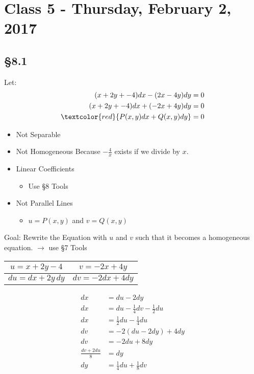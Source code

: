 \chapter{Class 5 - Thursday, February 2, 2017}
\section*{\S 8.1}
\begin{ex} Let:
\begin{align*}
    (x+2y+-4)dx-(2x-4y)dy&=0\\
    (x+2y+-4)dx+(-2x+4y)dy&=0\\
    \textcolor{red}{P(x,y)dx+Q(x,y)dy}&=0
\end{align*}
\begin{itemize}
  \item Not Separable
  \item Not Homogeneous Because $-\frac{4}{x}$ exists if we divide by $x$.
  \item Linear Coefficients
  \begin{itemize}
    \item Use \S 8 Tools
  \end{itemize}
  \item Not Parallel Lines
  \begin{itemize}
  \item  $u=P(x,y)$ and $v=Q(x,y)$
  \end{itemize}
\end{itemize}
\begin{note}
Goal: Rewrite the Equation with $u$ and $v$ such that it becomes a homogeneous equation. $\rightarrow$ use \S 7 Tools
\end{note}
\begin{center}
 \begin{tabular}{|c|c|} 
 \hline
 $u=x+2y-4$ & $v=-2x+4y$\\
 \hline
 $du=dx+2y\,dy$ & $dv=-2dx+4dy$\\ 
 \hline
\end{tabular}
\end{center}
\begin{align*}
    dx&= du-2dy\\
    dx&=du-\frac{1}{4}dv-\frac{1}{2}du\\
    dx&=\frac{1}{2}du-\frac{1}{4}du\\
    dv&=-2(du-2dy)+4dy\\
    dv&= -2du+8dy\\
    \frac{dv+2du}{8}&= dy\\
    dy&=\frac{1}{4}du+\frac{1}{8}dv
\end{align*}
\end{ex}

